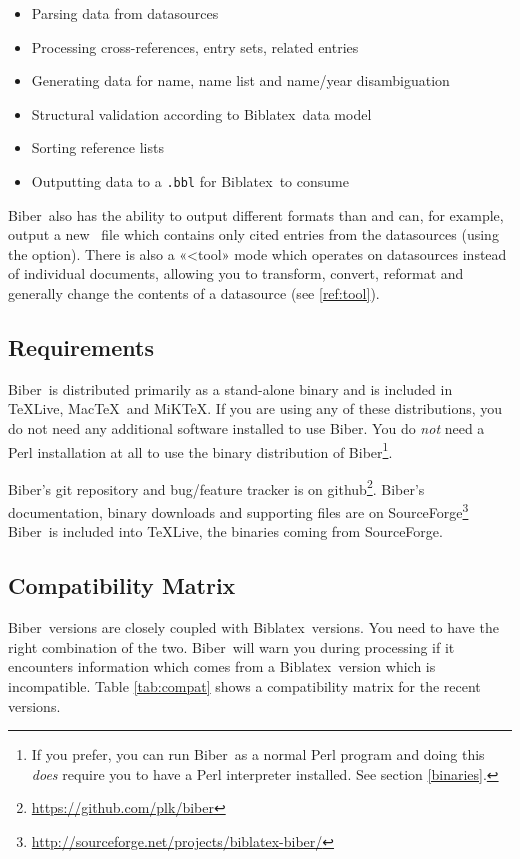 \documentclass{ltxdockit}
\newcommand*{\biber}{Biber\xspace}
\newcommand*{\biblatex}{Biblatex\xspace}
\begin{document}
\begin{itemize}
\item Parsing data from datasources
\item Processing cross-references, entry sets, related entries
\item Generating data for name, name list and name/year disambiguation
\item Structural validation according to \biblatex\ data model
\item Sorting reference lists
\item Outputting data to a \verb+.bbl+ for \biblatex\ to consume
\end{itemize}

\biber\ also has the ability to output different formats than 
and can, for example, output a new \bibtex\ file which contains only
cited entries from the datasources (using the 
option). There is also a «<tool» mode which operates on datasources instead
of individual documents, allowing you to transform, convert, reformat and
generally change the contents of a datasource (see \ref{ref:tool}).

\subsection{Requirements}\label{ref:req}

\biber\ is distributed primarily as a stand-alone binary and is
included in \TeX Live, Mac\TeX\ and MiK\TeX. If you are using any of these
distributions, you do not need any additional software installed to use
\biber. You do \emph{not} need a Perl installation at all to use
the binary distribution of \biber\footnote{If you prefer, you can run
\biber\ as a normal Perl program and doing this \emph{does} require
you to have a Perl interpreter installed. See section \ref{binaries}.}.

\biber's git repository and bug/feature tracker is on
github\footnote{\url{https://github.com/plk/biber}}. \biber's documentation,
binary downloads and supporting files are on
SourceForge\footnote{\url{http://sourceforge.net/projects/biblatex-biber/}}
\biber\ is included into \TeX Live, the binaries coming from SourceForge.

\subsection{Compatibility Matrix}

\biber\ versions are closely coupled with \biblatex\ versions. You
need to have the right combination of the two. \biber\ will warn you
during processing if it encounters information which comes from a
\biblatex\ version which is incompatible. Table \ref{tab:compat} shows a
compatibility matrix for the recent versions.
\end{document}
